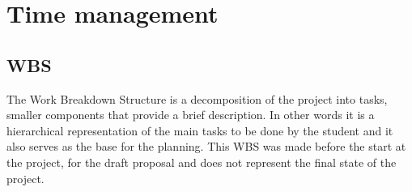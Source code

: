 
\section{Time management}
\subsection{WBS}
The Work Breakdown Structure is a decomposition of the project into tasks, smaller components that provide a brief description.
In other words it is a hierarchical representation of the main tasks to be done by the student and it also serves as the base for the planning.
This WBS was made before the start at the project, for the draft proposal and does not represent the final state of the project.

